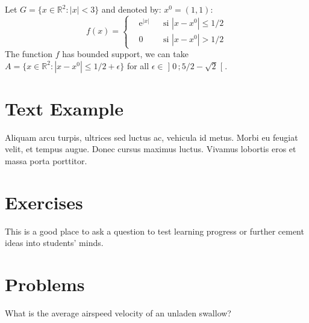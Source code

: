 \documentclass[
12pt, %
a4paper, %
fleqn,   %
]{notes}
\begin{document}
\begin{example}
    Let $G=\{x\in\mathbb{R}^2:|x|<3\}$ and denoted by: $x^0=(1,1)$:
    \begin{equation}
        f(x)=\left\{\begin{aligned} & \mathrm{e}^{|x|} & & \text{si $|x-x^0|\leq
            1/2$}\\ & 0 & & \text{si $|x-x^0|> 1/2$}\end{aligned}\right.
    \end{equation}
    The function $f$ has bounded support, we can take
    $A=\{x\in\mathbb{R}^2:|x-x^0|\leq 1/2+\epsilon\}$ for all
    $\epsilon\in\mathopen{]}0\,;5/2-\sqrt{2}\mathclose{[}$.
\end{example}


\section{Text Example}

\begin{example}
    Aliquam arcu turpis, ultrices sed luctus ac, vehicula id metus. Morbi eu
    feugiat velit, et tempus augue. Donec cursus maximus luctus. Vivamus
    lobortis eros et massa porta porttitor.
\end{example}


\newpage
\section{Exercises}

\begin{exercise}
    This is a good place to ask a question to test learning progress or further
    cement ideas into students' minds.
\end{exercise}


\section{Problems}

\begin{problem}
    What is the average airspeed velocity of an unladen swallow?
\end{problem}
\end{document}
